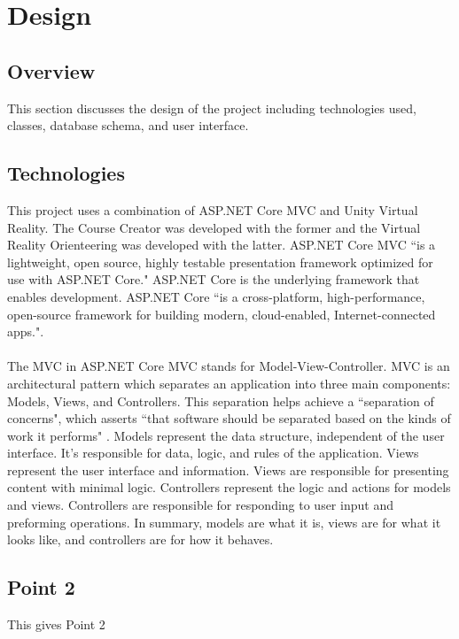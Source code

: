 \section{Design}
\label{sec:Design}

\subsection{Overview} 
This section discusses the design of the project including technologies used, classes, database schema, and user interface.

\subsection{Technologies}
This project uses a combination of ASP.NET Core MVC and Unity Virtual Reality. The Course Creator was developed with the former and the Virtual Reality Orienteering was developed with the latter. ASP.NET Core MVC ``is a lightweight, open source, highly testable presentation framework optimized for use with ASP.NET Core." \cite{dotnetcoremvc} ASP.NET Core is the underlying framework that enables development. ASP.NET Core ``is a cross-platform, high-performance, open-source framework for building modern, cloud-enabled, Internet-connected apps."\cite{dotnetcore}.\\
\\
The MVC in ASP.NET Core MVC stands for Model-View-Controller. MVC is an architectural pattern which separates an application into three main components: Models, Views, and Controllers. This separation helps achieve a ``separation of concerns", which asserts ``that software should be separated based on the kinds of work it performs" \cite{separationOfConcerns}. Models represent the data structure, independent of the user interface. It's responsible for data, logic, and rules of the application. Views represent the user interface and information. Views are responsible for presenting content with minimal logic. Controllers represent the logic and actions for models and views. Controllers are responsible for responding to user input and preforming operations. In summary, models are what it is, views are for what it looks like, and controllers are for how it behaves. 

\subsection{Point 2}
This gives Point 2
